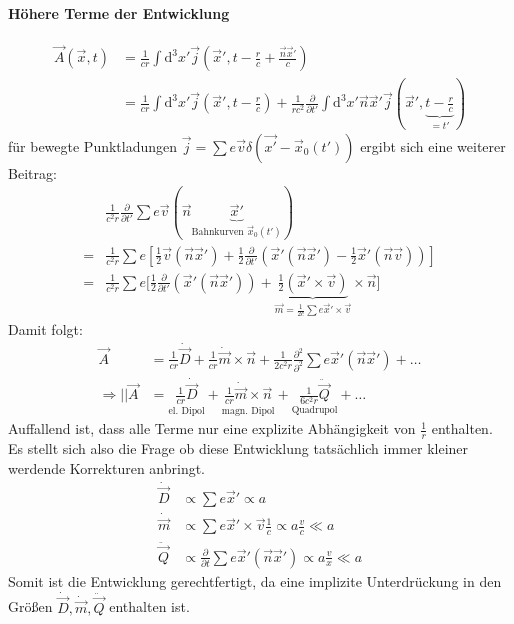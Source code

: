 \documentclass[a4paper]{article}
\begin{document}
\paragraph{Höhere Terme der Entwicklung}
\begin{align}
\vec{A}(\vec{x},t)&=\frac{1}{cr}\int\mathrm{d}^3x'
\vec{j}(\vec{x}',t-\frac{r}{c}+\frac{\vec{n}\vec{x}'}{c})\\
&= \frac{1}{cr}\int\mathrm{d}^3x'
\vec{j}(\vec{x}',t-\frac{r}{c})+\frac{1}{rc^2}\frac{\partial}{\partial
t'}\int\mathrm{d}^3x' \vec{n}\vec{x}'\vec{j}(\vec{x}',\underbrace{t-\frac{r}{c}}_{=t'})
\end{align}
für bewegte Punktladungen $\vec{j}=\sum e\vec{v} \delta(\vec{x'}-\vec{x}_0(t'))$
ergibt sich eine weiterer Beitrag:
\begin{align}
&\frac{1}{c^2r}\frac{\partial}{\partial t'}\sum
e\vec{v}(\vec{n}\underbrace{\vec{x}'}_{\text{Bahnkurven }\vec{x}_0(t')})\\
=&\frac{1}{c^2r}\sum e \left[\frac{1}{2}\vec{v}(\vec{n}\vec{x}')+
\frac{1}{2}\frac{\partial}{\partial t'} \left( \vec{x}' (\vec{n}\vec{x}') -
\frac{1}{2}\vec{x}'(\vec{n}\vec{v})\right)\right]\\
=&\frac{1}{c^2r}\sum e \Big[\frac{1}{2} \frac{\partial}{\partial t'} \left(
\vec{x}' (\vec{n}\vec{x}') \right)
+\underbrace{\frac{1}{2}(\vec{x}'\times\vec{v})}_{\vec{m}=\frac{1}{2c}\sum
e\vec{x}'\times\vec{v}}\times\vec{n}\Big]
\end{align}
Damit folgt:
\begin{align}
\vec{A}&=\frac{1}{cr}\dot{\vec{D}}+\frac{1}{cr}\dot{\vec{m}}\times\vec{n}+\frac{1}{2c^2r}\frac{\partial^2}{\partial^2}
\sum e\vec{x}'(\vec{n}\vec{x}')+\ldots\\
\Rightarrow
||\vec{A}&=\underset{\text{el. Dipol}}{\frac{1}{cr}\dot{\vec{D}}}+
\underset{\text{magn. Dipol}}{\frac{1}{cr}\dot{\vec{m}}\times\vec{n}}+
\underset{\text{Quadrupol}}{\frac{1}{6c^2r}\ddot{\vec{Q}}}+\ldots
\end{align}
Auffallend ist, dass alle Terme nur eine explizite Abhängigkeit von
$\frac{1}{r}$ enthalten. Es stellt sich also die Frage ob diese Entwicklung
tatsächlich immer kleiner werdende Korrekturen anbringt. 
\begin{align}
\dot{\vec{D}}&\propto \sum e\vec{x}'\propto a\\
\dot{\vec{m}}&\propto \sum e\vec{x}'\times\vec{v}\frac{1}{c} \propto
a\frac{v}{c} \ll a\\
\ddot{\vec{Q}}&\propto \frac{\partial}{\partial t}\sum
e\vec{x}'(\vec{n}\vec{x}')\propto a\frac{v}{x} \ll a
\end{align}
Somit ist die Entwicklung gerechtfertigt, da eine implizite Unterdrückung in den
Größen $\dot{\vec{D}},\dot{\vec{m}},\ddot{\vec{Q}}$ enthalten ist.
\end{document}

